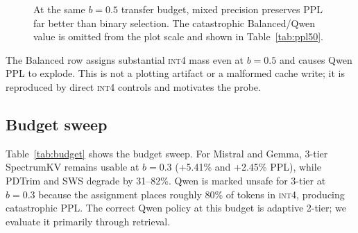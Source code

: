 \documentclass[11pt]{article}
\newcommand{\method}{SpectrumKV}
\newcommand{\budget}{b}
\newcommand{\pct}{\%}
\newcommand{\intiv}{\textsc{int4}}
\theoremstyle{plain}
\theoremstyle{definition}
\begin{document}
\begin{figure}[t]
\centering
{}
\caption{At the same $\budget=0.5$ transfer budget, mixed precision preserves PPL far better than binary selection.  The catastrophic Balanced/Qwen value is omitted from the plot scale and shown in Table~\ref{tab:ppl50}.}
\label{fig:ppl50}
\end{figure}

The Balanced row assigns substantial \intiv{} mass even at $\budget=0.5$ and causes Qwen PPL to explode.  This is not a plotting artifact or a malformed cache write; it is reproduced by direct \intiv{} controls and motivates the probe.

\subsection{Budget sweep}
\label{sec:rq8}

Table~\ref{tab:budget} shows the budget sweep.  For Mistral and Gemma, 3-tier \method{} remains usable at $\budget=0.3$ (+5.41\pct{} and +2.45\pct{} PPL), while PDTrim and SWS degrade by 31--82\pct{}.  Qwen is marked unsafe for 3-tier at $\budget=0.3$ because the assignment places roughly 80\pct{} of tokens in \intiv{}, producing catastrophic PPL.  The correct Qwen policy at this budget is adaptive 2-tier; we evaluate it primarily through retrieval.
\end{document}
